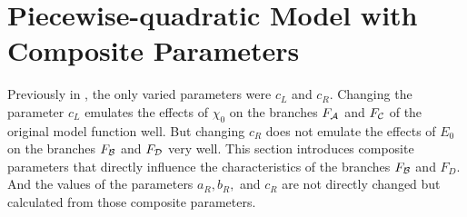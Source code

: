 \section{Piecewise-quadratic Model with Composite Parameters}
\label{sec:setup.quad.hyper}

Previously in , the only varied parameters were $c_L$ and $c_R$.
Changing the parameter $c_L$ emulates the effects of $\chi_0$ on the branches $F_{\mathcal{A}}$ and $F_{\mathcal{C}}$ of the original model function well.
But changing $c_R$ does not emulate the effects of $E_0$ on the branches $F_{\mathcal{B}}$ and $F_{\mathcal{D}}$ very well.
This section introduces composite parameters that directly influence the characteristics of the branches $F_{\mathcal{B}}$ and $F_D$.
And the values of the parameters $a_R, b_R,$ and $c_R$ are not directly changed but calculated from those composite parameters.




